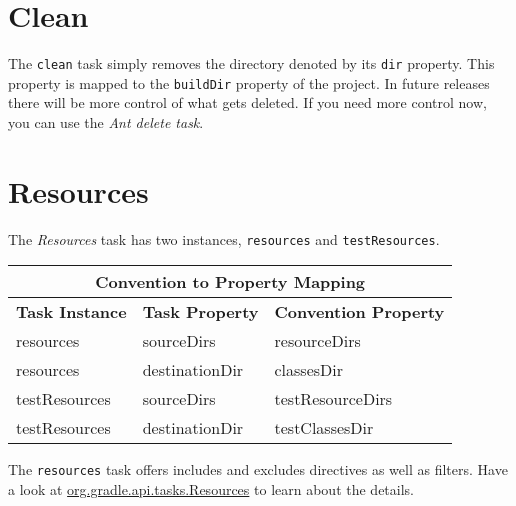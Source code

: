 \section{Clean} %
\label{sec:clean}
The \texttt{clean} task simply removes the directory denoted by its \texttt{dir} property. This property is mapped to the \texttt{buildDir} property of the project. In future releases there will be more control of what gets deleted. If you need more control now, you can use the \emph{Ant delete task}.  

\section{Resources} %
\label{sec:resources}
The \emph{Resources} task has two instances, \texttt{resources} and \texttt{testResources}. 
\begin{center}
	\begin{tabular}{|l|l|l|} \hline
		\multicolumn{3}{|c|}{Convention to Property Mapping} \\ \hline
		\textbf{Task Instance} & \textbf{Task Property} & \textbf{Convention Property} \\ \hline
		resources & sourceDirs & resourceDirs \\ \hline
		resources & destinationDir & classesDir \\ \hline
		testResources & sourceDirs & testResourceDirs \\ \hline
		testResources & destinationDir & testClassesDir \\ \hline
	\end{tabular} 
\end{center}
\noindent The \texttt{resources} task offers includes and excludes directives as well as filters. Have a look at \href{\API tasks/Resources.html}{org.gradle.api.tasks.Resources} to learn about the details.

